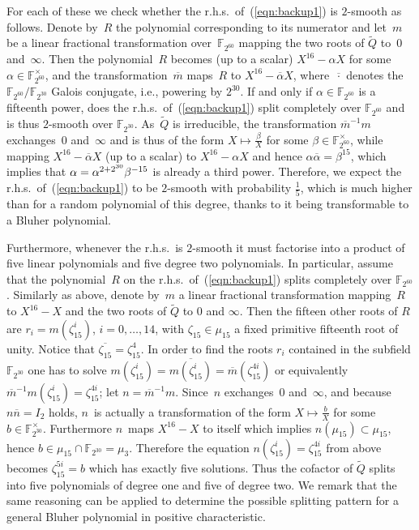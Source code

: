 \documentclass[11pt]{llncs}
\newcommand{\F}{\mathbb F}
\begin{document}
For each of these we check whether the r.h.s.\ of~(\ref{eqn:backup1})
is $2$-smooth as follows.  Denote by~$R$ the polynomial corresponding
to its numerator and let~$m$ be a linear fractional transformation
over~$\F_{2^{60}}$ mapping the two roots of $\widetilde Q$ to~$0$
and~$\infty$.  Then the polynomial~$R$ becomes (up to a scalar)
$X^{16} - \alpha X$ for some $\alpha \in \F_{2^{60}}^{\times}$, and the
transformation~$\overline m$ maps~$R$ to $X^{16} - \overline \alpha X$,
where~$\overline \cdot$ denotes the $\F_{2^{60}} / \F_{2^{30}}$ Galois
conjugate, i.e., powering by $2^{30}$.  If and only if
$\alpha \in \F_{2^{60}}$ is a fifteenth power, does the r.h.s.\
of~(\ref{eqn:backup1}) split completely over $\F_{2^{60}}$ and is thus
$2$-smooth over $\F_{2^{30}}$.  As~$\widetilde Q$ is irreducible,
the transformation $\overline m^{-1} m$ exchanges~$0$ and~$\infty$
and is thus of the form $X \mapsto \frac \beta X$ for some $\beta \in
\F_{2^{60}}^{\times}$, while mapping $X^{16} - \overline \alpha X$ (up to a scalar)
to $X^{16} - \alpha X$ and hence $\alpha \overline \alpha = \beta^{15}$,
which implies that $\alpha = \smash{\alpha^{2+2^{30}}} \beta^{-15}$ is already
a third power.  Therefore, we expect the r.h.s.\ of~(\ref{eqn:backup1})
to be $2$-smooth with probability $\frac 1 5$, which is much higher
than for a random polynomial of this degree, thanks to it being
transformable to a Bluher polynomial.

Furthermore, whenever the r.h.s.\ is $2$-smooth it must factorise into a product of five linear polynomials and five degree two polynomials.
In particular, assume that the polynomial~$R$ on the r.h.s.\ of~(\ref{eqn:backup1}) splits completely over
$\F_{2^{60}}$.  Similarly as above, denote by~$m$ a linear fractional transformation mapping~$R$ to $X^{16} - X$ and the two roots of $\widetilde{Q}$ to 
$0$ and $\infty$.  Then the fifteen other roots of $R$ are $r_i=m(\zeta_{15}^i)$, $i = 0, \dots, 14$, with $\zeta_{15} \in \mu_{15}$ 
a fixed primitive fifteenth root of unity.  Notice that $\overline{\zeta_{15}}=\zeta_{15}^4$. 
In order to find the roots $r_i$ contained in the subfield $\F_{2^{30}}$
one has to solve $m(\zeta_{15}^i)=\overline{m(\zeta_{15}^i)}=\overline{m}(\zeta_{15}^{4i})$ or equivalently 
$\overline{m}^{-1} m(\zeta_{15}^i) = \zeta_{15}^{4i}$; 
let $n = \overline{m}^{-1} m$. Since~$n$ exchanges~$0$ and~$\infty$, and because $n \overline{n} = I_2$ holds, $n$~is actually a 
transformation of the form $X \mapsto \frac{b} X$ for some $b \in \F_{2^{30}}^{\times}$. Furthermore $n$~maps $X^{16} - X$ to 
itself which implies $n(\mu_{15}) \subset \mu_{15}$, hence
$b \in \mu_{15} \cap \F_{2^{30}}=\mu_3$. Therefore the equation $n(\zeta_{15}^i)=\zeta_{15}^{4i}$ 
from above becomes $\zeta_{15}^{5i} = b$ which has exactly five solutions. 
Thus the cofactor of $\widetilde{Q}$ splits into five polynomials of degree one and 
five of degree two. We remark that the same reasoning can be applied to determine the possible splitting pattern for a general Bluher 
polynomial in positive characteristic.
\end{document}
